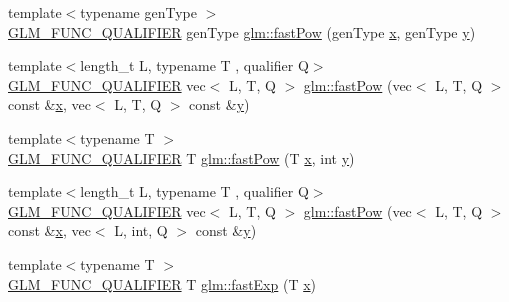 \begin{DoxyCompactItemize}
\item 
{\footnotesize template$<$typename gen\+Type $>$ }\\\hyperlink{setup_8hpp_a33fdea6f91c5f834105f7415e2a64407}{G\+L\+M\+\_\+\+F\+U\+N\+C\+\_\+\+Q\+U\+A\+L\+I\+F\+I\+ER} gen\+Type \hyperlink{group__gtx__fast__exponential_ga5340e98a11fcbbd936ba6e983a154d50}{glm\+::fast\+Pow} (gen\+Type \hyperlink{_s_d_l__opengl_8h_ad0e63d0edcdbd3d79554076bf309fd47}{x}, gen\+Type \hyperlink{_s_d_l__opengl_8h_a1675d9d7bb68e1657ff028643b4037e3}{y})
\item 
{\footnotesize template$<$length\+\_\+t L, typename T , qualifier Q$>$ }\\\hyperlink{setup_8hpp_a33fdea6f91c5f834105f7415e2a64407}{G\+L\+M\+\_\+\+F\+U\+N\+C\+\_\+\+Q\+U\+A\+L\+I\+F\+I\+ER} vec$<$ L, T, Q $>$ \hyperlink{group__gtx__fast__exponential_ga15325a8ed2d1c4ed2412c4b3b3927aa2}{glm\+::fast\+Pow} (vec$<$ L, T, Q $>$ const \&\hyperlink{_s_d_l__opengl_8h_ad0e63d0edcdbd3d79554076bf309fd47}{x}, vec$<$ L, T, Q $>$ const \&\hyperlink{_s_d_l__opengl_8h_a1675d9d7bb68e1657ff028643b4037e3}{y})
\item 
{\footnotesize template$<$typename T $>$ }\\\hyperlink{setup_8hpp_a33fdea6f91c5f834105f7415e2a64407}{G\+L\+M\+\_\+\+F\+U\+N\+C\+\_\+\+Q\+U\+A\+L\+I\+F\+I\+ER} T \hyperlink{namespaceglm_a5a5fcbdc3b4ecfaddf5c66774259bcd3}{glm\+::fast\+Pow} (T \hyperlink{_s_d_l__opengl_8h_ad0e63d0edcdbd3d79554076bf309fd47}{x}, int \hyperlink{_s_d_l__opengl_8h_a1675d9d7bb68e1657ff028643b4037e3}{y})
\item 
{\footnotesize template$<$length\+\_\+t L, typename T , qualifier Q$>$ }\\\hyperlink{setup_8hpp_a33fdea6f91c5f834105f7415e2a64407}{G\+L\+M\+\_\+\+F\+U\+N\+C\+\_\+\+Q\+U\+A\+L\+I\+F\+I\+ER} vec$<$ L, T, Q $>$ \hyperlink{namespaceglm_a2bfd1ff618f99738909aa2a81576df97}{glm\+::fast\+Pow} (vec$<$ L, T, Q $>$ const \&\hyperlink{_s_d_l__opengl_8h_ad0e63d0edcdbd3d79554076bf309fd47}{x}, vec$<$ L, int, Q $>$ const \&\hyperlink{_s_d_l__opengl_8h_a1675d9d7bb68e1657ff028643b4037e3}{y})
\item 
{\footnotesize template$<$typename T $>$ }\\\hyperlink{setup_8hpp_a33fdea6f91c5f834105f7415e2a64407}{G\+L\+M\+\_\+\+F\+U\+N\+C\+\_\+\+Q\+U\+A\+L\+I\+F\+I\+ER} T \hyperlink{group__gtx__fast__exponential_gaa3180ac8f96ab37ab96e0cacaf608e10}{glm\+::fast\+Exp} (T \hyperlink{_s_d_l__opengl_8h_ad0e63d0edcdbd3d79554076bf309fd47}{x})

\end{DoxyCompactItemize}
